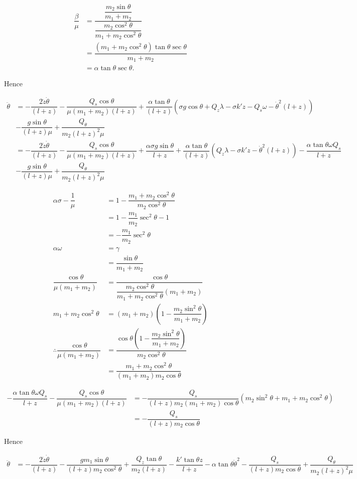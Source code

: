 \documentclass[12pt,a4paper,portrait]{article}
\begin{document}
	\begin{align*}
		\dfrac{\beta}{\mu} &= \dfrac{\dfrac{m_2\sin{\theta}}{m_1+m_2}}{\dfrac{m_2\cos^2{\theta}}{m_1+m_2\cos^2{\theta}}} \\
		&= \dfrac{(m_1+m_2\cos^2{\theta})\tan{\theta}\sec{\theta}}{m_1+m_2} \\
		&= \alpha \tan{\theta}\sec{\theta}.
	\end{align*}
	
	Hence
	
	\begin{align*}
		\ddot{\theta} &= -\dfrac{2\dot{z}\dot{\theta}}{(l+z)} - \dfrac{Q_s\cos{\theta}}{\mu(m_1+m_2)(l+z)} +\dfrac{\alpha\tan{\theta}}{(l+z)}(\sigma g\cos{\theta} + Q_z\lambda - \sigma k'z-Q_s\omega -\dot{\theta}^2(l+z)) \\
		&- \dfrac{g\sin{\theta}}{(l+z)\mu} + \dfrac{Q_{\theta}}{m_2(l+z)^2 \mu} \\
		&= -\dfrac{2\dot{z}\dot{\theta}}{(l+z)} - \dfrac{Q_s\cos{\theta}}{\mu(m_1+m_2)(l+z)} +\dfrac{\alpha\sigma g\sin{\theta}}{l+z}+\dfrac{\alpha\tan{\theta}}{(l+z)}(Q_z\lambda - \sigma k'z -\dot{\theta}^2(l+z)) -\dfrac{\alpha\tan{\theta}\omega Q_s}{l+z} \\
		&- \dfrac{g\sin{\theta}}{(l+z)\mu} + \dfrac{Q_{\theta}}{m_2(l+z)^2 \mu}
	\end{align*}
	
	\begin{align*}
		\alpha \sigma - \dfrac{1}{\mu} &= 1 - \dfrac{m_1+m_2\cos^2{\theta}}{m_2\cos^2{\theta}} \\
		&= 1 - \dfrac{m_1}{m_2}\sec^2{\theta} - 1 \\
		&= -\dfrac{m_1}{m_2}\sec^2{\theta} \\
		\alpha\omega &= \gamma \\
		&= \dfrac{\sin{\theta}}{m_1+m_2} \\
		\dfrac{\cos{\theta}}{\mu(m_1+m_2)} &= \dfrac{\cos{\theta}}{\dfrac{m_2\cos^2{\theta}}{m_1+m_2\cos^2{\theta}}(m_1+m_2)} \\
		m_1+m_2\cos^2{\theta} &= (m_1+m_2)\left(1-\dfrac{m_2\sin^2{\theta}}{m_1+m_2}\right)\\
		\therefore \dfrac{\cos{\theta}}{\mu(m_1+m_2)} &= \dfrac{\cos{\theta}\left(1-\dfrac{m_2\sin^2{\theta}}{m_1+m_2}\right)}{m_2\cos^2{\theta}} \\
		&= \dfrac{m_1+m_2\cos^2{\theta}}{(m_1+m_2)m_2\cos{\theta}}
	\end{align*}

	\begin{align*}
		-\dfrac{\alpha\tan{\theta}\omega Q_s}{l+z} - \dfrac{Q_s\cos{\theta}}{\mu(m_1+m_2)(l+z)} &= -\dfrac{Q_s}{(l+z)m_2(m_1+m_2)\cos{\theta}}\left(m_2\sin^2{\theta}+m_1+m_2\cos^2{\theta}\right)\\
		&= -\dfrac{Q_s}{(l+z)m_2\cos{\theta}}
	\end{align*}
	
	Hence
	
	\begin{align*}
		\ddot{\theta} &=-\dfrac{2\dot{z}\dot{\theta}}{(l+z)} -\dfrac{gm_1\sin{\theta}}{(l+z)m_2\cos^2{\theta}}+\dfrac{Q_z\tan{\theta}}{m_2(l+z)} - \dfrac{k'\tan{\theta}z}{l+z} -\alpha \tan{\theta}\dot{\theta}^2 - \dfrac{Q_s}{(l+z)m_2\cos{\theta}} + \dfrac{Q_{\theta}}{m_2(l+z)^2 \mu}
	\end{align*}
\end{document}
